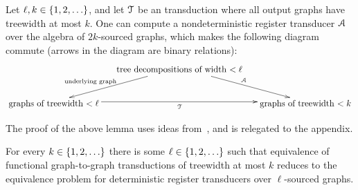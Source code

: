 

\begin{lemma}\label{lem:transduction-to-registers}
    Let $\ell, k \in \{1,2,\ldots\}$, and  let ${\mathcal T}$ be an \mso transduction where all output graphs have treewidth at most $k$. One can compute  a nondeterministic register transducer ${{\mathcal A}}$ over the algebra of $2k$-sourced graphs, which makes the following diagram commute (arrows in the diagram are binary relations):
    \begin{align*}
    \xymatrix@C=0.5cm{
         & \txt{tree decompositions of width $< \ell$}
        \ar[dl]_-{\txt{\scriptsize underlying graph \qquad \qquad}}
         \ar[dr]^\Aa\\
        \txt{graphs of treewidth $< \ell$}\ar[rr]_\Tt & &
        \txt{graphs  of treewidth $< k$} 
    }
    \end{align*}
\end{lemma}
The proof of the above lemma uses ideas from~\cite{courcelleMonadicSecondorderLogic1990,bloem_comparison_2000,alurStreamingTreeTransducers2017}, and  is relegated to the appendix.  

\begin{corollary}
For every $k \in \{1,2,\ldots\}$ there is some $\ell \in \{1,2,\ldots\}$ such that equivalence of functional graph-to-graph \mso transductions of treewidth at most $k$ reduces to the equivalence problem for deterministic register transducers over $\ell$-sourced graphs. 
\end{corollary}

